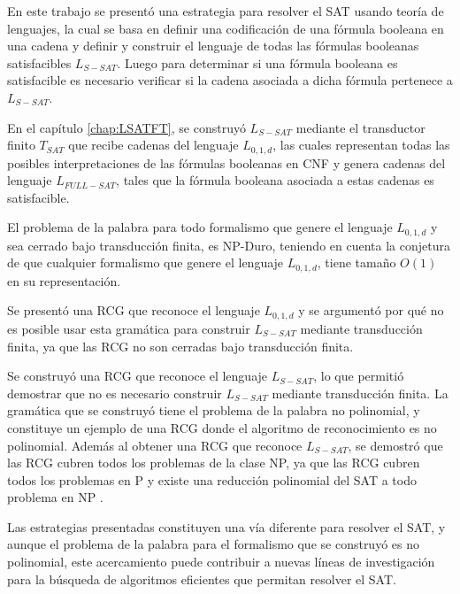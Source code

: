 \begin{conclusions}

En este trabajo se presentó una estrategia para resolver el SAT usando teoría de lenguajes, la cual se basa en definir
una codificación de una fórmula booleana en una cadena y definir y construir el lenguaje de todas las fórmulas booleanas
satisfacibles $L_{S-SAT}$. Luego para determinar si una fórmula booleana es satisfacible es necesario verificar si la cadena asociada
a dicha fórmula pertenece a $L_{S-SAT}$.

En el capítulo \ref{chap:LSATFT}, se construyó $L_{S-SAT}$ mediante el transductor finito $T_{SAT}$ que recibe
cadenas del lenguaje $L_{0,1,d}$, las cuales representan todas las posibles interpretaciones de las fórmulas
booleanas en CNF y genera cadenas del lenguaje $L_{FULL-SAT}$, tales que la fórmula booleana asociada a estas
cadenas es satisfacible.

El problema de la palabra para todo formalismo que genere
el lenguaje $L_{0,1,d}$ y sea cerrado bajo transducción finita, es NP-Duro, teniendo en cuenta la conjetura
de que cualquier formalismo que genere el lenguaje $L_{0,1,d}$, tiene tamaño $O(1)$ en su representación.

Se presentó una RCG que reconoce el lenguaje $L_{0,1,d}$ y se argumentó por qué no es posible
usar esta gramática para construir $L_{S-SAT}$ mediante transducción finita, ya que las RCG no son cerradas bajo transducción finita.

Se construyó una RCG que reconoce el lenguaje $L_{S-SAT}$, lo que permitió demostrar
que no es necesario construir $L_{S-SAT}$ mediante transducción finita. La gramática que se construyó tiene el problema
de la palabra no polinomial, y constituye un ejemplo de una RCG donde el algoritmo de reconocimiento es no polinomial.
Además al obtener una RCG que reconoce $L_{S-SAT}$, se demostró que las RCG cubren todos los problemas de la clase NP,
ya que las RCG cubren todos los problemas en P \cite{mainRCGBib} y existe una reducción polinomial del SAT a todo problema en NP \cite{authomataTheory}.

Las estrategias presentadas constituyen una vía diferente
para resolver el SAT, y aunque el problema de la palabra para el formalismo que se construyó es no polinomial,
este acercamiento puede contribuir a nuevas líneas de investigación para la búsqueda de algoritmos eficientes que permitan
resolver el SAT.

    
\end{conclusions}
